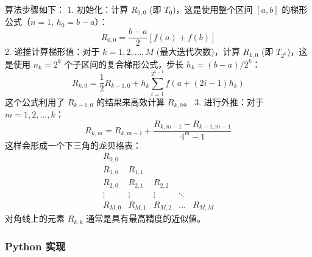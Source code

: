 \documentclass[11pt]{article}
\begin{document}
算法步骤如下： 1. 初始化：计算 \(R_{0,0}\) (即
\(T_0\))，这是使用整个区间 \([a,b]\) 的梯形公式（\(n=1\),
\(h_0 = b-a\)）： \[ R_{0,0} = \frac{b-a}{2} [f(a) + f(b)] \] 2.
递推计算梯形值：对于 \(k = 1, 2, \dots, M\) (最大迭代次数)，计算
\(R_{k,0}\) (即 \(T_{2^k}\))，这是使用 \(n_k = 2^k\)
个子区间的复合梯形公式，步长 \(h_k = (b-a)/2^k\)：
\[ R_{k,0} = \frac{1}{2} R_{k-1,0} + h_k \sum_{i=1}^{2^{k-1}} f(a + (2i-1)h_k) \]
这个公式利用了 \(R_{k-1,0}\) 的结果来高效计算 \(R_{k,0}\)。 3.
进行外推：对于 \(m = 1, 2, \dots, k\)：
\[ R_{k,m} = R_{k,m-1} + \frac{R_{k,m-1} - R_{k-1,m-1}}{4^m - 1} \]
这样会形成一个下三角的龙贝格表： \[
    \begin{array}{ccccc}
    R_{0,0} & & & & \\
    R_{1,0} & R_{1,1} & & & \\
    R_{2,0} & R_{2,1} & R_{2,2} & & \\
    \vdots & \vdots & \vdots & \ddots & \\
    R_{M,0} & R_{M,1} & R_{M,2} & \dots & R_{M,M}
    \end{array}
    \] 对角线上的元素 \(R_{k,k}\) 通常是具有最高精度的近似值。

\subsubsection{Python 实现}\label{python-ux5b9eux73b0}
\end{document}
